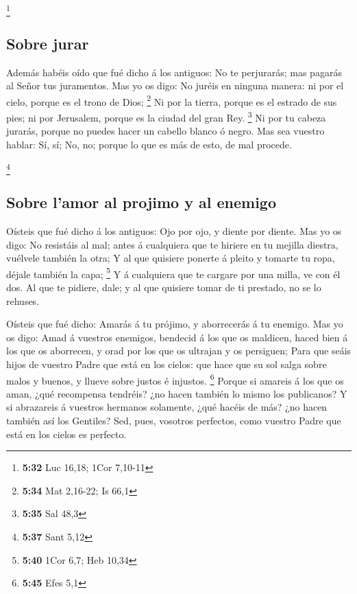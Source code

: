 \footnote{\textbf{5:32} Luc 16,18; 1Cor 7,10-11}

\hypertarget{sobre-jurar}{%
\subsection{Sobre jurar}\label{sobre-jurar}}

 Además habéis oído que fué dicho á los antiguos: No te
perjurarás; mas pagarás al Señor tus juramentos.  Mas yo
os digo: No juréis en ninguna manera: ni por el cielo, porque es el
trono de Dios; \footnote{\textbf{5:34} Mat 2,16-22; Is 66,1}
 Ni por la tierra, porque es el estrado de sus pies; ni
por Jerusalem, porque es la ciudad del gran Rey. \footnote{\textbf{5:35}
  Sal 48,3}  Ni por tu cabeza jurarás, porque no puedes
hacer un cabello blanco ó negro.  Mas sea vuestro hablar:
Sí, sí; No, no; porque lo que es más de esto, de mal procede.

\footnote{\textbf{5:37} Sant 5,12}

\hypertarget{sobre-lamor-al-projimo-y-al-enemigo}{%
\subsection{Sobre l'amor al projimo y al
enemigo}\label{sobre-lamor-al-projimo-y-al-enemigo}}

 Oísteis que fué dicho á los antiguos: Ojo por ojo, y
diente por diente.  Mas yo os digo: No resistáis al mal;
antes á cualquiera que te hiriere en tu mejilla diestra, vuélvele
también la otra;  Y al que quisiere ponerte á pleito y
tomarte tu ropa, déjale también la capa; \footnote{\textbf{5:40} 1Cor
  6,7; Heb 10,34}  Y á cualquiera que te cargare por una
milla, ve con él dos.  Al que te pidiere, dale; y al que
quisiere tomar de ti prestado, no se lo rehuses.

 Oísteis que fué dicho: Amarás á tu prójimo, y
aborrecerás á tu enemigo.  Mas yo os digo: Amad á
vuestros enemigos, bendecid á los que os maldicen, haced bien á los que
os aborrecen, y orad por los que os ultrajan y os persiguen;
 Para que seáis hijos de vuestro Padre que está en los
cielos: que hace que su sol salga sobre malos y buenos, y llueve sobre
justos é injustos. \footnote{\textbf{5:45} Efes 5,1} 
Porque si amareis á los que os aman, ¿qué recompensa tendréis? ¿no hacen
también lo mismo los publicanos?  Y si abrazareis á
vuestros hermanos solamente, ¿qué hacéis de más? ¿no hacen también así
los Gentiles?  Sed, pues, vosotros perfectos, como
vuestro Padre que está en los cielos es perfecto.

